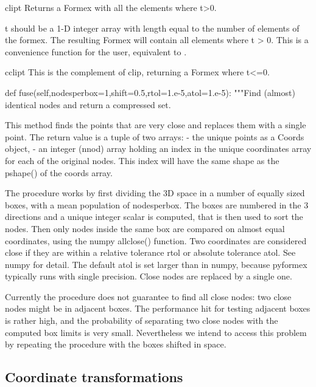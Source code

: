 \begin{methoddesc}{clip}{t}
Returns a Formex with all the elements where t>0.

t should be a 1-D integer array with length equal to the number
of elements of the formex.
The resulting Formex will contain all elements where t > 0.
This is a convenience function for the user, equivalent to
.
\end{methoddesc}

\begin{methoddesc}{cclip}{t}
This is the complement of clip, returning a Formex where t<=0.
\end{methoddesc}

    def fuse(self,nodesperbox=1,shift=0.5,rtol=1.e-5,atol=1.e-5):
        """Find (almost) identical nodes and return a compressed set.

        This method finds the points that are very close and replaces them
        with a single point. The return value is a tuple of two arrays:
        - the unique points as a Coords object,
        - an integer (nnod) array holding an index in the unique
        coordinates array for each of the original nodes. This index will
        have the same shape as the pshape() of the coords array.

        The procedure works by first dividing the 3D space in a number of
        equally sized boxes, with a mean population of nodesperbox.
        The boxes are numbered in the 3 directions and a unique integer scalar
        is computed, that is then used to sort the nodes.
        Then only nodes inside the same box are compared on almost equal
        coordinates, using the numpy allclose() function. Two coordinates are
        considered close if they are within a relative tolerance rtol or absolute
        tolerance atol. See numpy for detail. The default atol is set larger than
        in numpy, because pyformex typically runs with single precision.
        Close nodes are replaced by a single one.

        Currently the procedure does not guarantee to find all close nodes:
        two close nodes might be in adjacent boxes. The performance hit for
        testing adjacent boxes is rather high, and the probability of separating
        two close nodes with the computed box limits is very small. Nevertheless
        we intend to access this problem by repeating the procedure with the
        boxes shifted in space.
 

\subsection{Coordinate transformations}

